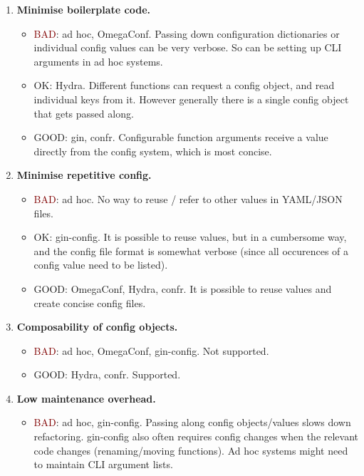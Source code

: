 \documentclass{itatnew}
\begin{document}
\begin{enumerate}
    \item \textbf{Minimise boilerplate code.}
        \begin{itemize}
            \item \textcolor{Maroon}{BAD}: ad hoc, OmegaConf. Passing down configuration dictionaries or individual config values can be very verbose. So can be setting up CLI arguments in ad hoc systems.
            \item \textcolor{YellowOrange}{OK}: Hydra. Different functions can request a config object, and read individual keys from it. However generally there is a single config object that gets passed along.
            \item \textcolor{OliveGreen}{GOOD}: gin, confr. Configurable function arguments receive a value directly from the config system, which is most concise.
        \end{itemize}
    \item \textbf{Minimise repetitive config.}
        \begin{itemize}
            \item \textcolor{Maroon}{BAD}: ad hoc. No way to reuse / refer to other values in YAML/JSON files.
            \item \textcolor{YellowOrange}{OK}: gin-config. It is possible to reuse values, but in a cumbersome way, and the config file format is somewhat verbose (since all occurences of a config value need to be listed).
            \item \textcolor{OliveGreen}{GOOD}: OmegaConf, Hydra, confr. It is possible to reuse values and create concise config files.
        \end{itemize}
    \item \textbf{Composability of config objects.}
        \begin{itemize}
            \item \textcolor{Maroon}{BAD}: ad hoc, OmegaConf, gin-config. Not supported.
            \item \textcolor{OliveGreen}{GOOD}: Hydra, confr. Supported.
        \end{itemize}
    \item \textbf{Low maintenance overhead.}
        \begin{itemize}
            \item \textcolor{Maroon}{BAD}: ad hoc, gin-config. Passing along config objects/values slows down refactoring. gin-config also often requires config changes when the relevant code changes (renaming/moving functions). Ad hoc systems might need to maintain CLI argument lists.

\end{itemize}
\end{enumerate}
\end{document}
